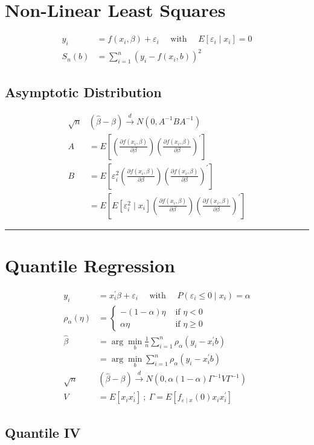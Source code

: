 \section{Non-Linear Least Squares}

\begin{align*}
    y_i&=f\left(x_i, \beta\right)+\varepsilon_i \quad \text { with } \quad E\left[\varepsilon_i \mid x_i\right]=0 \\
    S_n(b)&=\sum_{i=1}^n\left(y_i-f\left(x_i, b\right)\right)^2
\end{align*}

\subsection{Asymptotic Distribution}

\begin{align*}
    \sqrt{n} & (\widehat{\beta}-\beta) \stackrel{d}{\longrightarrow} N\left(0, A^{-1} B A^{-1}\right) \\
    A &= E\left[\left(\frac{\partial f\left(x_i, \beta\right)}{\partial \beta}\right)\left(\frac{\partial f\left(x_i, \beta\right)}{\partial \beta}\right)^{\prime}\right] \\
    B &= E\left[\varepsilon_i^2\left(\frac{\partial f\left(x_i, \beta\right)}{\partial \beta}\right)\left(\frac{\partial f\left(x_i, \beta\right)}{\partial \beta}\right)^{\prime}\right] \\
    &= E\left[E\left[\varepsilon_i^2 \mid x_i\right]\left(\frac{\partial f\left(x_i, \beta\right)}{\partial \beta}\right)\left(\frac{\partial f\left(x_i, \beta\right)}{\partial \beta}\right)^{\prime}\right]
\end{align*}

\hrule
\section{Quantile Regression}

\begin{align*}
    y_i&=x_i^{\prime} \beta+\varepsilon_i \quad \text { with } \quad P\left(\varepsilon_i \leq 0 \mid x_i\right)=\alpha \\
    \rho_\alpha(\eta) &=
    \left\{
        \begin{array}{cc}
            -(1-\alpha) \eta & \text { if } \eta<0 \\
            \alpha \eta & \text { if } \eta \geq 0
        \end{array}
    \right. \\
    \widehat{\beta} &= \arg \min _b \frac{1}{n} \sum_{i=1}^n \rho_\alpha\left(y_i-x_i^{\prime} b\right) \\
    &=\arg \min _b \sum_{i=1}^n \rho_\alpha\left(y_i-x_i^{\prime} b\right) \\
    \sqrt{n} & (\hat{\beta}-\beta) \stackrel{d}{\longrightarrow} N\left(0, \alpha(1-\alpha) \Gamma^{-1} V \Gamma^{-1}\right) \\
    V &= E\left[x_i x_i^{\prime}\right] \: ; \: \Gamma = E\left[f_{\varepsilon \mid x}(0) x_i x_i^{\prime}\right]
\end{align*}

\subsection{Quantile IV}


